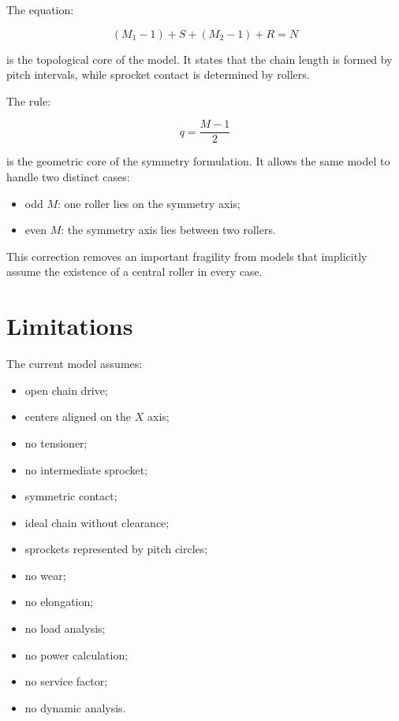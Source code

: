 \documentclass[12pt,a4paper]{article}
\begin{document}
The equation:

\begin{equation}
(M_1-1)+S+(M_2-1)+R=N
\end{equation}

is the topological core of the model. It states that the chain length is formed by pitch intervals, while sprocket contact is determined by rollers.

The rule:

\begin{equation}
q=\frac{M-1}{2}
\end{equation}

is the geometric core of the symmetry formulation. It allows the same model to handle two distinct cases:

\begin{itemize}
    \item odd $M$: one roller lies on the symmetry axis;
    \item even $M$: the symmetry axis lies between two rollers.
\end{itemize}

This correction removes an important fragility from models that implicitly assume the existence of a central roller in every case.

\section{Limitations}

The current model assumes:

\begin{itemize}
    \item open chain drive;
    \item centers aligned on the $X$ axis;
    \item no tensioner;
    \item no intermediate sprocket;
    \item symmetric contact;
    \item ideal chain without clearance;
    \item sprockets represented by pitch circles;
    \item no wear;
    \item no elongation;
    \item no load analysis;
    \item no power calculation;
    \item no service factor;
    \item no dynamic analysis.
\end{itemize}
\end{document}
